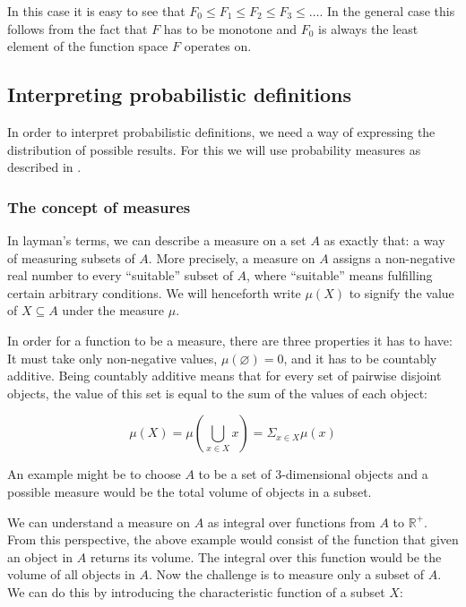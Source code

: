 \documentclass[11pt, leqno, titlepage]{article}
\theoremstyle{definition}
\begin{document}
In this case it is easy to see that $F_0 \leq F_1 \leq F_2 \leq F_3 \leq \dots$. In
the general case this follows from the fact that $F$ has to be monotone and $F_0$ is
always the least element of the function space $F$ operates on. 


\subsection{Interpreting probabilistic definitions}\label{sec:prob-interp}
In order to interpret probabilistic definitions, we need a way of expressing
the distribution of possible results. For this we will use probability measures as
described in \cite{rml-paper}.

\subsubsection{The concept of measures}
In layman's terms, we can describe a measure on a set $A$ as exactly that: a way of
measuring subsets of $A$. More precisely, a measure on $A$ assigns a non-negative
real number to every ``suitable'' subset of $A$, where ``suitable'' means fulfilling
certain arbitrary conditions. We will henceforth write $\mu (X)$ to signify the value
of $X \subseteq A$ under the measure $\mu$. 

In order for a function to be a measure, there are three properties it has to have:
It must take only non-negative values, $\mu (\varnothing) = 0$, and it has to be
countably additive. Being countably additive means that for every set of pairwise
disjoint objects, the value of this set is equal to the sum of the values of each
object:

\begin{equation*}
  \mu (X) = \mu(\bigcup_{x\in X} x) = \Sigma_{x\in X} \mu (x)
\end{equation*}

An example might be to choose $A$ to be a set of 3-dimensional objects and a possible
measure would be the total volume of objects in a subset. 

 We can understand a measure on $A$ as integral
over functions from $A$ to $\mathbb{R}^+$. From this perspective, the above example
would consist of the function that given an object in $A$ returns its volume. The
integral over this function would be the volume of all objects in $A$. Now the
challenge is to measure only a subset of $A$. We can do this by introducing the
characteristic function of a subset $X$\cite{wiki-measure}:
\end{document}
